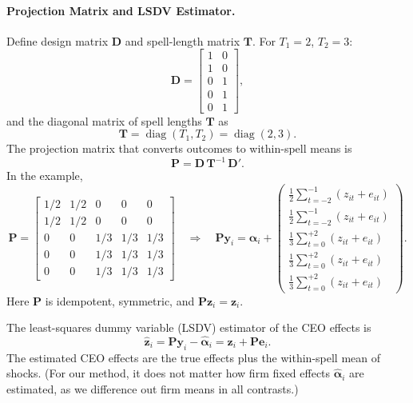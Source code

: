 \documentclass[11pt,a4paper]{article}
\begin{document}
\paragraph{Projection Matrix and LSDV Estimator.} Define design matrix $\mathbf D$ and spell-length matrix $\mathbf T$. For $T_1=2$, $T_2=3$:
\[
  \mathbf D = \begin{bmatrix}
    1 & 0\\
    1 & 0\\
    0 & 1\\
    0 & 1\\
    0 & 1
  \end{bmatrix},
\]
and the diagonal matrix of spell lengths $\mathbf T$ as
$$
  \mathbf T = \operatorname{diag}(T_1,T_2)=\operatorname{diag}(2,3).
$$
The projection matrix that converts outcomes to within-spell means is
$$
  \mathbf P = \mathbf D\,\mathbf T^{-1}\,\mathbf D'.
$$
In the example,
\[
  \mathbf P = \begin{bmatrix}
    1/2 & 1/2 & 0 & 0 & 0\\
    1/2 & 1/2 & 0 & 0 & 0\\
    0 & 0 & 1/3 & 1/3 & 1/3\\
    0 & 0 & 1/3 & 1/3 & 1/3\\
    0 & 0 & 1/3 & 1/3 & 1/3
  \end{bmatrix}\quad\Rightarrow\quad
  \mathbf {Py}_i = 
  \mathbf\alpha_i +
  \begin{pmatrix}
  \frac12 \sum_{t=-2}^{-1} (z_{it} + e_{it}) \\
  \frac12 \sum_{t=-2}^{-1} (z_{it} + e_{it}) \\
  \frac13 \sum_{t=0}^{+2} (z_{it} + e_{it})\\
  \frac13 \sum_{t=0}^{+2} (z_{it} + e_{it})\\
  \frac13 \sum_{t=0}^{+2} (z_{it} + e_{it})
  \end{pmatrix}.
\]
Here $\mathbf P$ is idempotent, symmetric, and $\mathbf P\mathbf z_i = \mathbf z_i$.

The least-squares dummy variable (LSDV) estimator of the CEO effects is
\begin{equation}\label{eq:lsdv_appendix}
  \hat{\mathbf z}_i = \mathbf P\mathbf y_i - \hat{\mathbf \alpha}_i = \mathbf z_i + \mathbf P\mathbf e_i.
\end{equation}  
The estimated CEO effects are the true effects plus the within-spell mean of shocks. (For our method, it does not matter how firm fixed effects $\hat{\mathbf \alpha}_i$ are estimated, as we difference out firm means in all contrasts.)
\end{document}
